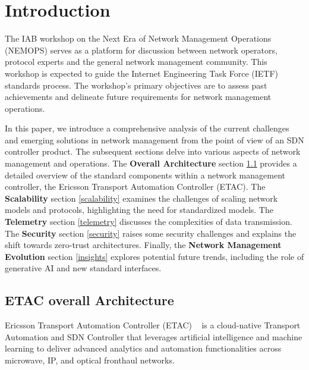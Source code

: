 \documentclass[10pt,sigconf]{iabart}
\begin{document}

\maketitle

\section{Introduction} \label{introduction}

The IAB workshop on the Next Era of Network Management Operations (NEMOPS) serves as a platform for discussion between network operators, protocol experts and the general network management community. This workshop is expected to guide the Internet Engineering Task Force (IETF) standards process. The workshop's primary objectives are to assess past achievements and delineate future requirements for network management operations.

In this paper, we introduce a comprehensive analysis of the current challenges and emerging solutions in network management from the point of view of an SDN controller product. The subsequent sections delve into various aspects of network management and operations. The \textbf{Overall Architecture} section \ref{overview} provides a detailed overview of the standard components within a network management controller, the Ericsson Transport Automation Controller (ETAC). The \textbf{Scalability} section \ref{scalability} examines the challenges of scaling network models and protocols, highlighting the need for standardized models. The \textbf{Telemetry} section \ref{telemetry} discusses the complexities of data transmission. The \textbf{Security} section \ref{security} raises some security challenges and explains the shift towards zero-trust architectures. Finally, the \textbf{Network Management Evolution} section \ref{insights} explores potential future trends, including the role of generative AI and new standard interfaces.



\subsection{ETAC overall Architecture} \label{overview}

Ericsson Transport Automation Controller (ETAC) ~\cite{ericsson-etac} is a cloud-native Transport Automation and SDN Controller that leverages artificial intelligence and machine learning to deliver advanced analytics and automation functionalities across microwave, IP, and optical fronthaul networks.
\end{document}
